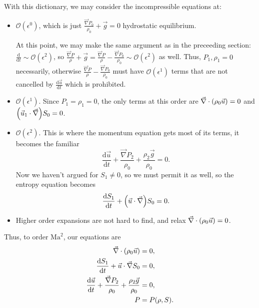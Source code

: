 \documentclass[11pt,
        usenames, %
        dvipsnames %
    ]{article}
\newcommand*{\rd}[2]{\frac{\mathrm{d}#1}{\mathrm{d}#2}}
\DeclarePairedDelimiter\p{\lparen}{\rparen}
\begin{document}
With this dictionary, we may consider the incompressible equations at:
\begin{itemize}
    \item $\mathcal{O}(\epsilon^0)$, which is just
        $\frac{\vec{\nabla}P_0}{\rho_0} + \vec{g} = 0$ hydrostatic equilibrium.

        At this point, we may make the same argument as in the preceeding
        section: $\rd{}{t} \sim \mathcal{O}(\epsilon^2)$, so
        $\frac{\vec{\nabla}P}{\rho} + \vec{g} = \frac{\vec{\nabla}P}{\rho} -
        \frac{\vec{\nabla}P_0}{\rho_0} \sim \mathcal{O}(\epsilon^2)$ as well.
        Thus, $P_1, \rho_1 = 0$ necessarily, otherwise
        $\frac{\vec{\nabla}P}{\rho} - \frac{\vec{\nabla}P_0}{\rho_0}$ must have
        $\mathcal{O}(\epsilon^1)$ terms that are not cancelled by
        $\rd{\vec{u}}{t}$ which is prohibited.

    \item $\mathcal{O}(\epsilon^1)$. Since $P_1 = \rho_1 = 0$, the only terms at
        this order are $\vec{\nabla} \cdot \p*{\rho_0 \vec{u}} = 0$ and
        $\p*{\vec{u}_1 \cdot \vec{\nabla}}S_0 = 0$.

    \item $\mathcal{O}(\epsilon^2)$. This is where the momentum equation gets
        most of its terms, it becomes the familiar
        \begin{equation}
            \rd{\vec{u}}{t} + \frac{\vec{\nabla}P_2}{\rho_0} + \frac{\rho_2
                \vec{g}}{\rho_0} = 0.
        \end{equation}
        Now we haven't argued for $S_1 \neq 0$, so we must permit it as well, so
        the entropy equation becomes
        \begin{equation}
            \rd{S_1}{t} + \p*{\vec{u} \cdot \vec{\nabla}}S_0 = 0.
        \end{equation}

    \item Higher order expansions are not hard to find, and relax $\vec{\nabla}
        \cdot \p*{\rho_0 \vec{u}} = 0$.
\end{itemize}
Thus, to order $\mathrm{Ma}^2$, our equations are
\begin{subequations}\label{se:anel_0}
    \begin{align}
        \vec{\nabla} \cdot \p*{\rho_0 \vec{u}} &= 0,\\
        \rd{S_1}{t} + \vec{u} \cdot \vec{\nabla}S_0 &= 0,\\
        \rd{\vec{u}}{t} + \frac{\vec{\nabla}P_2}{\rho_0}
            + \frac{\rho_2 \vec{g}}{\rho_0} &= 0,\\
        P &= P(\rho, S).
    \end{align}
\end{subequations}
\end{document}
